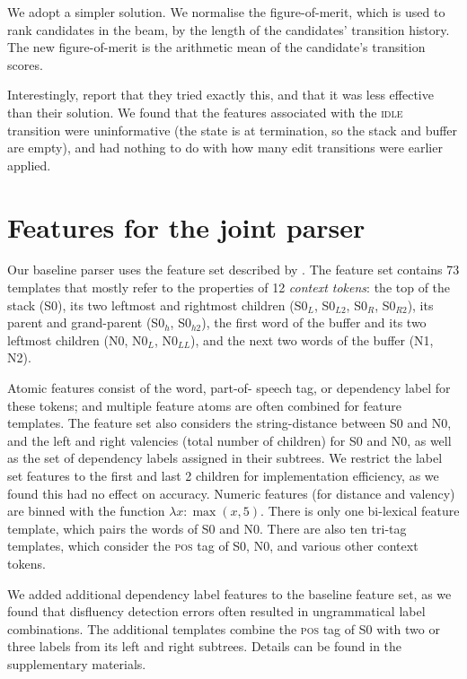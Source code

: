 \documentclass[11pt,letterpaper]{article}
\newcommand{\pos}{\textsc{pos}\xspace}
\newcommand{\szero}{S0\xspace}
\newcommand{\nzero}{N0\xspace}
\newcommand{\szeroH}{S0$_h$\xspace}
\newcommand{\szeroHH}{S0$_{h2}$\xspace}
\newcommand{\szeroL}{S0$_L$\xspace}
\newcommand{\szeroLL}{S0$_{L2}$\xspace}
\newcommand{\szeroR}{S0$_R$\xspace}
\newcommand{\szeroRR}{S0$_{R2}$\xspace}
\newcommand{\nzeroL}{N0$_L$\xspace}
\newcommand{\nzeroLL}{N0$_{LL}$\xspace}
\begin{document}
We adopt a simpler solution.  We normalise the figure-of-merit, which is used to rank
candidates in the beam, by the length of the candidates' transition history. The
new figure-of-merit is the
arithmetic mean of the candidate's transition scores.

Interestingly, \citet{zhang:13} report that they tried exactly this, and that it
was less effective than their solution. We found that the features
associated with the \textsc{idle} transition were uninformative (the state is at
termination, so the stack and buffer are empty), and had nothing to do with how
many edit transitions were earlier applied.

\section{Features for the joint parser}
\label{sec:features}

Our baseline parser uses the feature set described by \citet{zhang:11}.
The feature set contains 73 templates that mostly refer to the properties of
12 \emph{context tokens}: the top of the stack (\szero), its two leftmost and
rightmost children (\szeroL, \szeroLL, \szeroR, \szeroRR), its parent and
grand-parent (\szeroH, \szeroHH), the first word of the buffer and its two leftmost
children (\nzero, \nzeroL, \nzeroLL), and the next two words of the buffer (N1, N2).

Atomic features consist of the word, part-of- speech tag, or dependency label
for these tokens; and multiple feature atoms are often combined for feature
templates. The feature set also considers the string-distance between \szero
and \nzero, and the left and right valencies
(total number of children) for \szero and \nzero, as well as the set of dependency
labels assigned in their subtrees. We restrict the label set features
to the first and last 2 children for implementation efficiency, as we found this
had no effect on accuracy. Numeric features (for distance and valency) are binned
with the function $\lambda x: \max(x, 5)$.
There is only one bi-lexical feature template, which pairs
the words of \szero and \nzero.
There are also ten tri-tag templates, which consider the
\pos tag of \szero, \nzero, and various other context tokens.

We added additional dependency label features to the baseline feature
set, as we found that disfluency detection errors often resulted in ungrammatical
label combinations.  The additional templates combine the \pos tag of \szero with
two or three labels from its left and right subtrees.  Details can be found in
the supplementary materials.
\end{document}
